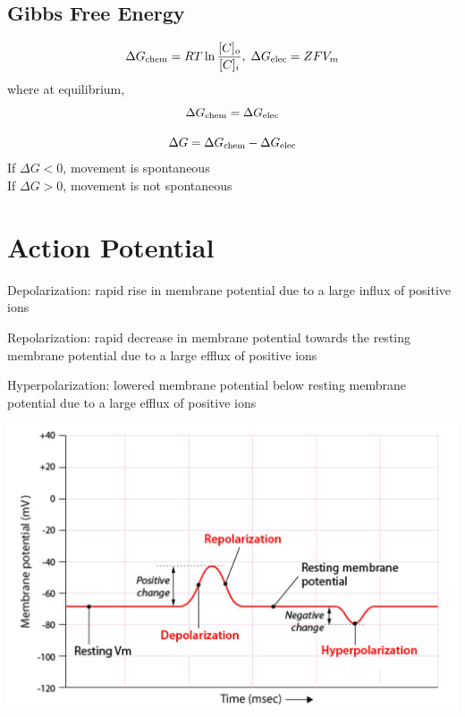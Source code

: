\documentclass[11pt,fleqn]{book}
\begin{document}
\subsection{Gibbs Free Energy}
\begin{theorem}
    $$\Delta G_{\rm chem}=RT\ln\frac{[C]_o}{[C]_i},\;\Delta G_{\rm elec}=ZFV_m$$
    where at equilibrium,
    $$\Delta G_{\rm chem}=\Delta G_{\rm elec}$$
\end{theorem}
\begin{proposition}
    $$\Delta G=\Delta G_{\rm chem}-\Delta G_{\rm elec}$$
    If $\Delta G < 0$, movement is spontaneous\\
    If $\Delta G > 0$, movement is not spontaneous
\end{proposition}

\section{Action Potential}
\begin{descriptions}
    \item[Depolarization:] rapid rise in membrane potential due to a large influx of positive ions
    \item[Repolarization:] rapid decrease in membrane potential towards the resting membrane potential due to a large efflux of positive ions
    \item[Hyperpolarization:] lowered membrane potential below resting membrane potential due to a large efflux of positive ions 
\end{descriptions}
\begin{center}
    \includegraphics[width=0.65\linewidth]{Pictures/Screenshot 2024-02-25 223612.png}
\end{center}
\end{document}
